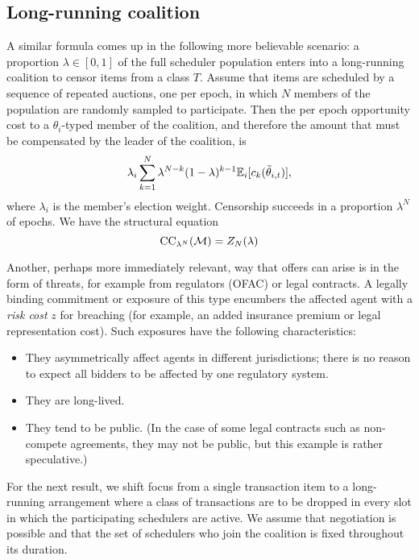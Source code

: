 


\subsection{Long-running coalition}
%
A similar formula comes up in the following more believable scenario: a proportion $\lambda\in[0,1]$ of the full scheduler population enters into a long-running coalition to censor items from a class $T$.
%
Assume that items are scheduled by a sequence of repeated auctions, one per epoch, in which $N$ members of the population are randomly sampled to participate.
%
Then the per epoch opportunity cost to a $\theta_i$-typed member of the coalition, and therefore the amount that must be compensated by the leader of the coalition, is
\[
  \lambda_i\sum_{k=1}^{N}\lambda^{N-k}(1-\lambda)^{k-1} \mathbb{E}_i[c_k(\tilde\theta_{i,t})],
\]
%
where $\lambda_i$ is the member's election weight.
%
Censorship succeeds in a proportion $\lambda^N$ of epochs.
%
We have the structural equation
\[
  \mathrm{CC}_{\lambda^N}(\mathcal{M}) = Z_N(\lambda)
\]

Another, perhaps more immediately relevant, way that offers can arise is in the form of threats, for example from regulators (OFAC) or legal contracts.
%
A legally binding commitment or exposure of this type encumbers the affected agent with a \emph{risk cost} $z$ for breaching (for example, an added insurance premium or legal representation cost).
%
Such exposures have the following characteristics:
\begin{itemize}
  \item They asymmetrically affect agents in different jurisdictions; there is no reason to expect all bidders to be affected by one regulatory system.
  \item They are long-lived.
  \item They tend to be public. (In the case of some legal contracts such as non-compete agreements, they may not be public, but this example is rather speculative.)
\end{itemize}


For the next result, we shift focus from a single transaction item to a long-running arrangement where a class of transactions are to be dropped in every slot in which the participating schedulers are active.
%
We assume that negotiation is possible and that the set of schedulers who join the coalition is fixed throughout its duration.

